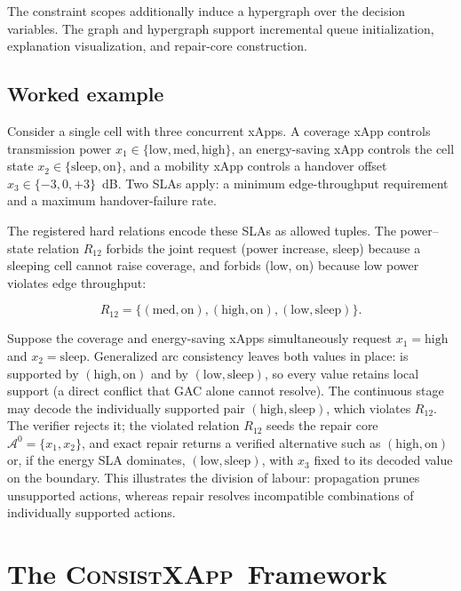 \documentclass[pdflatex,sn-mathphys-num,iicol,oneside]{sn-jnl}
\newcommand{\method}{\textsc{ConsistXApp}}
\begin{document}
The constraint scopes additionally induce a hypergraph over the
decision variables. The graph and hypergraph support incremental
queue initialization, explanation visualization, and repair-core
construction.

\subsection{Worked example}
\label{sec:worked-example}

Consider a single cell with three concurrent xApps. A coverage xApp
controls transmission power $x_1\in\{\text{low},\text{med},\text{high}\}$,
an energy-saving xApp controls the cell state
$x_2\in\{\text{sleep},\text{on}\}$, and a mobility xApp controls a
handover offset $x_3\in\{-3,0,+3\}$~dB. Two SLAs apply: a minimum
edge-throughput requirement and a maximum handover-failure rate.

The registered hard relations encode these SLAs as allowed tuples.
The power--state relation $R_{12}$ forbids the joint request
(power increase, sleep) because a sleeping cell cannot raise coverage,
and forbids (low, on) because low power violates edge throughput:

\begin{equation}
R_{12}=
\{(\text{med},\text{on}),(\text{high},\text{on}),
(\text{low},\text{sleep})\}.
\end{equation}

Suppose the coverage and energy-saving xApps simultaneously request
$x_1=\text{high}$ and $x_2=\text{sleep}$. Generalized arc consistency
leaves both values in place:  is supported by
$(\text{high},\text{on})$ and  by $(\text{low},\text{sleep})$,
so every value retains local support (a direct conflict that GAC alone
cannot resolve). The continuous stage may decode the individually
supported pair $(\text{high},\text{sleep})$, which violates $R_{12}$.
The verifier rejects it; the violated relation $R_{12}$ seeds the
repair core $\mathcal{A}^0=\{x_1,x_2\}$, and exact repair returns a
verified alternative such as $(\text{high},\text{on})$ or, if the
energy SLA dominates, $(\text{low},\text{sleep})$, with $x_3$ fixed to
its decoded value on the boundary. This illustrates the division of
labour: propagation prunes unsupported actions, whereas repair resolves
incompatible combinations of individually supported actions.


\section{The \method\ Framework}
\label{sec:method}
\end{document}
